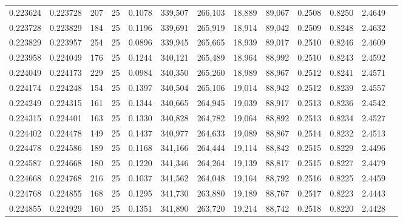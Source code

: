 \begin{tabular}{rrrrrrrrrrrrr}
0.223624 & 0.223728 &   207 &  25 &                                     0.1078 & 339,507 & 266,103 &  18,889 &  89,067 & 0.2508 & 0.8250 & 2.4649 \\
0.223728 & 0.223829 &   184 &  25 &                                     0.1196 & 339,691 & 265,919 &  18,914 &  89,042 & 0.2509 & 0.8248 & 2.4632 \\
0.223829 & 0.223957 &   254 &  25 &                                     0.0896 & 339,945 & 265,665 &  18,939 &  89,017 & 0.2510 & 0.8246 & 2.4609 \\
0.223958 & 0.224049 &   176 &  25 &                                     0.1244 & 340,121 & 265,489 &  18,964 &  88,992 & 0.2510 & 0.8243 & 2.4592 \\
0.224049 & 0.224173 &   229 &  25 &                                     0.0984 & 340,350 & 265,260 &  18,989 &  88,967 & 0.2512 & 0.8241 & 2.4571 \\
0.224174 & 0.224248 &   154 &  25 &                                     0.1397 & 340,504 & 265,106 &  19,014 &  88,942 & 0.2512 & 0.8239 & 2.4557 \\
0.224249 & 0.224315 &   161 &  25 &                                     0.1344 & 340,665 & 264,945 &  19,039 &  88,917 & 0.2513 & 0.8236 & 2.4542 \\
0.224315 & 0.224401 &   163 &  25 &                                     0.1330 & 340,828 & 264,782 &  19,064 &  88,892 & 0.2513 & 0.8234 & 2.4527 \\
0.224402 & 0.224478 &   149 &  25 &                                     0.1437 & 340,977 & 264,633 &  19,089 &  88,867 & 0.2514 & 0.8232 & 2.4513 \\
0.224478 & 0.224586 &   189 &  25 &                                     0.1168 & 341,166 & 264,444 &  19,114 &  88,842 & 0.2515 & 0.8229 & 2.4496 \\
0.224587 & 0.224668 &   180 &  25 &                                     0.1220 & 341,346 & 264,264 &  19,139 &  88,817 & 0.2515 & 0.8227 & 2.4479 \\
0.224668 & 0.224768 &   216 &  25 &                                     0.1037 & 341,562 & 264,048 &  19,164 &  88,792 & 0.2516 & 0.8225 & 2.4459 \\
0.224768 & 0.224855 &   168 &  25 &                                     0.1295 & 341,730 & 263,880 &  19,189 &  88,767 & 0.2517 & 0.8223 & 2.4443 \\
0.224855 & 0.224929 &   160 &  25 &                                     0.1351 & 341,890 & 263,720 &  19,214 &  88,742 & 0.2518 & 0.8220 & 2.4428 \\

\end{tabular}
